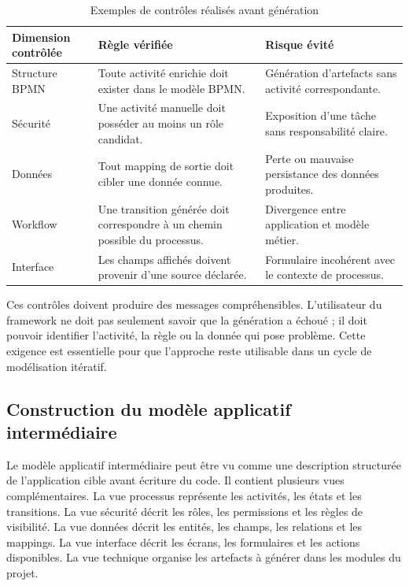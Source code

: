 \begin{table}[H]
\centering
\small
\caption{Exemples de contrôles réalisés avant génération}
\label{tab:chap3-controles-generation}
\begin{tabular}{p{4.2cm}p{5.2cm}p{4.4cm}}
\hline
\textbf{Dimension contrôlée} & \textbf{Règle vérifiée} & \textbf{Risque évité} \\
\hline
Structure BPMN & Toute activité enrichie doit exister dans le modèle BPMN. & Génération d'artefacts sans activité correspondante. \\
Sécurité & Une activité manuelle doit posséder au moins un rôle candidat. & Exposition d'une tâche sans responsabilité claire. \\
Données & Tout mapping de sortie doit cibler une donnée connue. & Perte ou mauvaise persistance des données produites. \\
Workflow & Une transition générée doit correspondre à un chemin possible du processus. & Divergence entre application et modèle métier. \\
Interface & Les champs affichés doivent provenir d'une source déclarée. & Formulaire incohérent avec le contexte de processus. \\
\hline
\end{tabular}
\end{table}

Ces contrôles doivent produire des messages compréhensibles. L'utilisateur du framework ne doit pas seulement savoir que la génération a échoué ; il doit pouvoir identifier l'activité, la règle ou la donnée qui pose problème. Cette exigence est essentielle pour que l'approche reste utilisable dans un cycle de modélisation itératif.

\subsection{Construction du modèle applicatif intermédiaire}

Le modèle applicatif intermédiaire peut être vu comme une description structurée de l'application cible avant écriture du code. Il contient plusieurs vues complémentaires. La vue processus représente les activités, les états et les transitions. La vue sécurité décrit les rôles, les permissions et les règles de visibilité. La vue données décrit les entités, les champs, les relations et les mappings. La vue interface décrit les écrans, les formulaires et les actions disponibles. La vue technique organise les artefacts à générer dans les modules du projet.


